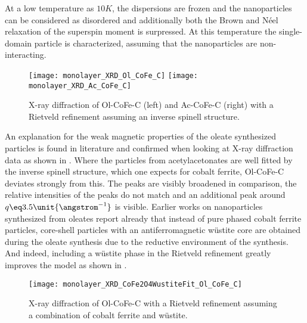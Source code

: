 \documentclass[\main/dresen_thesis.tex]{subfiles}
\begin{document}
    At a low temperature as $10 \unit{K}$, the dispersions are frozen and the nanoparticles can be considered as disordered and additionally both the Brown and N\'eel relaxation of the superspin moment is surpressed.
    At this temperature the single-domain particle is characterized, assuming that the nanoparticles are non-interacting.

    \begin{figure}[tb]
      \centering
      \texttt{[image: monolayer\_XRD\_Ol\_CoFe\_C]}
      \texttt{[image: monolayer\_XRD\_Ac\_CoFe\_C]}
      \caption{\label{fig:monolayers:nanoparticle:xrd}X-ray diffraction of Ol-CoFe-C (left) and Ac-CoFe-C (right) with a Rietveld refinement assuming an inverse spinell structure.}
    \end{figure}

    An explanation for the weak magnetic properties of the oleate synthesized particles is found in literature and confirmed when looking at X-ray diffraction data as shown in .
    Where the particles from acetylacetonates are well fitted by the inverse spinell structure, which one expects for cobalt ferrite, Ol-CoFe-C deviates strongly from this.
    The peaks are visibly broadened in comparison, the relative intensities of the peaks do not match and an additional peak around $q \eq 3.5 \unit{\angstrom^{-1}}$ is visible.
    Earlier works on nanoparticles synthesized from oleates \cite{Bodnarchuk_2009_Excha, Wetterskog_2013_Anoma} report already that instead of pure phased cobalt ferrite particles, core-shell particles with an antiferromagnetic w\"ustite core are obtained during the oleate synthesis due to the reductive environment of the synthesis.
    And indeed, including a w\"ustite phase in the Rietveld refinement greatly improves the model as shown in .

    \begin{figure}[tb]
      \centering
      \texttt{[image: monolayer\_XRD\_CoFe2O4WustiteFit\_Ol\_CoFe\_C]}
      \caption{\label{fig:monolayers:nanoparticle:xrdWustite}X-ray diffraction of Ol-CoFe-C with a Rietveld refinement assuming a combination of cobalt ferrite and w\"ustite.}
    \end{figure}
\end{document}
